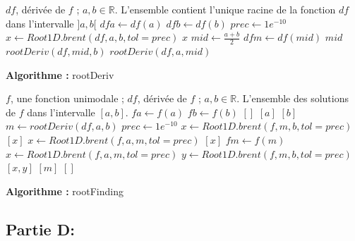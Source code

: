\documentclass[a4paper, 12pt]{article}
\begin{document}
\begin{algorithm}

\begin{algorithmic}[1]

\REQUIRE \( df \), dérivée de \( f \) ; \( a, b  \in \mathbb{R} \).
\ENSURE L'ensemble contient l'unique racine de la fonction \( df \) dans l'intervalle \( ]a, b[ \)
\STATE \( dfa \leftarrow df(a) \)
\STATE \( dfb \leftarrow df(b) \)
\STATE \( prec \leftarrow 1e^{-10} \)
	\STATE \( x \leftarrow Root1D.brent(df, a, b, tol=prec) \)
	\RETURN $x$
\ELSE
	\STATE \( mid \leftarrow \frac{a + b}{2} \)
	\STATE \( dfm \leftarrow df(mid) \)
		\RETURN $mid$
		\RETURN \( rootDeriv(df, mid, b) \)
	\ELSE
		\RETURN \( rootDeriv(df, a, mid) \)
	\ENDIF
\ENDIF
\caption{\textbf{Algorithme : }rootDeriv}
\end{algorithmic}

\end{algorithm}%
\begin{algorithm}

\begin{algorithmic}[1]

\REQUIRE \( f \), une fonction unimodale ; \( df \), dérivée de \( f \) ; \( a, b  \in \mathbb{R} \).
\ENSURE L'ensemble des solutions de \( f \) dans l'intervalle \( [a, b] \).
\STATE \( fa \leftarrow f(a) \)
\STATE \( fb \leftarrow f(b) \)
	\RETURN  $[]$
	\RETURN $[a]$
	\RETURN $[b]$
\ELSE
	\STATE \( m \leftarrow rootDeriv(df, a, b) \)
	\STATE \( prec \leftarrow 1e^{-10}\)
		\STATE \( x \leftarrow Root1D.brent(f, m, b, tol=prec) \)
		\RETURN $[x]$
		\STATE \( x \leftarrow Root1D.brent(f, a, m, tol=prec) \)
		\RETURN $[x]$
	\ELSE
		\STATE \( fm \leftarrow f(m) \)
			\STATE \( x \leftarrow Root1D.brent(f, a, m, tol=prec) \)
			\STATE \( y \leftarrow Root1D.brent(f, m, b, tol=prec) \)
			\RETURN $[x, y]$
			\RETURN $[m]$
		\ELSE
			\RETURN $[]$
		\ENDIF
	\ENDIF
\ENDIF
\caption{\textbf{Algorithme : }rootFinding}
\end{algorithmic}

\end{algorithm}

\newpage

\subsection{Partie D:}
\end{document}

